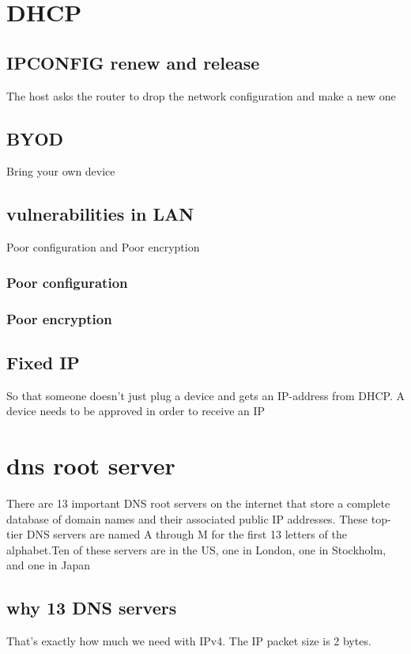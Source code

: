 \documentclass[a4paper,12pt]{article}
\begin{document}
\section{DHCP}

\subsection{IPCONFIG renew and release}
The host asks the router to drop the network configuration and make a new one

\subsection{BYOD}
Bring your own device

\subsection{vulnerabilities in LAN}
Poor configuration and Poor encryption

\subsubsection{Poor configuration}

\subsubsection{Poor encryption}


\subsection{Fixed IP}
So that someone doesn't just plug a device and gets an IP-address from DHCP. A device needs to be approved in order to receive an IP

\section{dns root server}
There are 13 important DNS root servers on the internet that store a complete database of domain names and their associated public IP addresses. These top-tier DNS servers are named A through M for the first 13 letters of the alphabet.Ten of these servers are in the US, one in London, one in Stockholm, and one in Japan 
\subsection{why 13 DNS servers}
That's exactly how much we need with IPv4. The IP packet size is 2 bytes.
\end{document}
